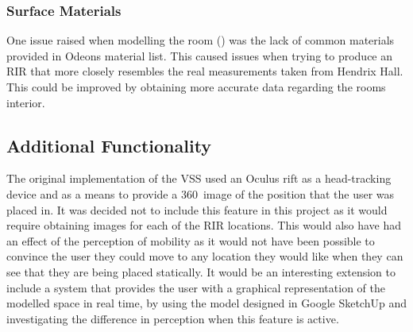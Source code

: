 \documentclass[../../main.tex]{subfiles}
\begin{document}
		\subsubsection{Surface Materials}
			One issue raised when modelling the room () was the lack of common materials provided in Odeons material list. This caused issues when trying to produce an \ac{RIR} that more closely resembles the real measurements taken from Hendrix Hall. This could be improved by obtaining more accurate data regarding the rooms interior.

	\subsection{Additional Functionality}
		The original implementation of the \ac{VSS} used an Oculus rift as a head-tracking device and as a means to provide a 360\textdegree~image of the position that the user was placed in. It was decided not to include this feature in this project as it would require obtaining images for each of the \ac{RIR} locations. This would also have had an effect of the perception of mobility as it would not have been possible to convince the user they could move to any location they would like when they can see that they are being placed statically. It would be an interesting extension to include a system that provides the user with a graphical representation of the modelled space in real time, by using the model designed in Google SketchUp and investigating the difference in perception when this feature is active.






\end{document}
